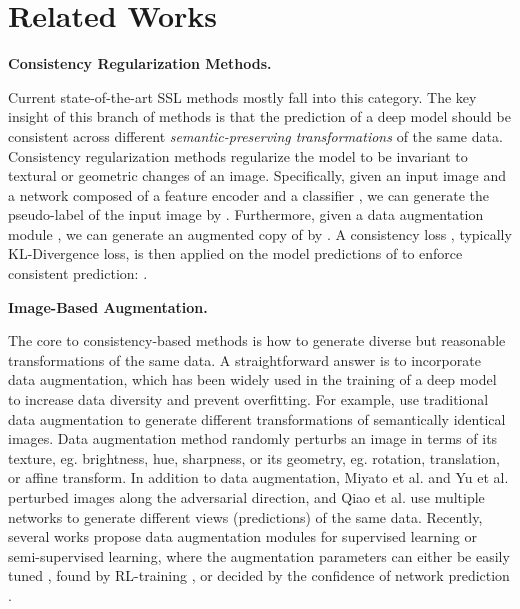 \documentclass[runningheads]{llncs}
\newcommand{\heading}[1]{
\vspace{1mm}\noindent\textbf{#1}
}
\begin{document}
 \section{Related Works}
\heading{Consistency Regularization Methods.}
Current state-of-the-art SSL methods mostly fall into this category.
The key insight of this branch of methods is that the prediction of a deep model should be consistent across different \textit{semantic-preserving transformations} of the same data.
Consistency regularization methods regularize the model to be invariant to textural or geometric changes of an image.
Specifically, given an input image  and a network composed of a feature encoder  and a classifier , we can generate the pseudo-label of the input image by .
Furthermore, given a data augmentation module , we can generate an augmented copy of  by .
A consistency loss , typically KL-Divergence loss, is then applied on the model predictions of  to enforce consistent prediction: .

\heading{Image-Based Augmentation.}
The core to consistency-based methods is how to generate diverse but reasonable transformations of the same data.
A straightforward answer is to incorporate data augmentation, which has been widely used in the training of a deep model to increase data diversity and prevent overfitting.
For example, \cite{berthelot2019mixmatch,Laine2017iclr,sajjadi2016regularization,tarvainen2017mean} use traditional data augmentation to generate different transformations of semantically identical images.
Data augmentation method randomly perturbs an image in terms of its texture, eg. brightness, hue, sharpness, or its geometry, eg. rotation, translation, or affine transform.
In addition to data augmentation, Miyato et al. \cite{miyato2018virtual} and Yu et al. \cite{yu2019tangent} perturbed images along the adversarial direction, and Qiao et al. \cite{qiao2018deep} use multiple networks to generate different views (predictions) of the same data.
Recently, several works propose data augmentation modules for supervised learning or semi-supervised learning, where the augmentation parameters can either be easily tuned \cite{cubuk2019randaugment}, found by RL-training \cite{cubuk2019autoaugment}, or decided by the confidence of network prediction \cite{berthelot2019remixmatch}.
\end{document}
